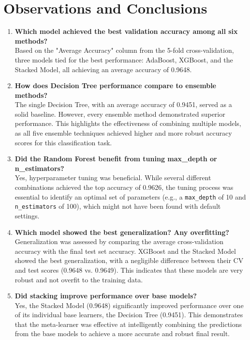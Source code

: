 \documentclass[12pt]{article}
\begin{document}
\section{Observations and Conclusions}

\begin{enumerate}[label=\textbf{\arabic*.}]
    \item \textbf{Which model achieved the best validation accuracy among all six methods?} \\
    Based on the "Average Accuracy" column from the 5-fold cross-validation, three models tied for the best performance: AdaBoost, XGBoost, and the Stacked Model, all achieving an average accuracy of 0.9648.

    \item \textbf{How does Decision Tree performance compare to ensemble methods?} \\
    The single Decision Tree, with an average accuracy of 0.9451, served as a solid baseline. However, every ensemble method demonstrated superior performance. This highlights the effectiveness of combining multiple models, as all five ensemble techniques achieved higher and more robust accuracy scores for this classification task.

    \item \textbf{Did the Random Forest benefit from tuning max\_depth or n\_estimators?} \\
     Yes, hyperparameter tuning was beneficial. While several different combinations achieved the top accuracy of 0.9626, the tuning process was essential to identify an optimal set of parameters (e.g., a \texttt{max\_depth} of 10 and \texttt{n\_estimators} of 100), which might not have been found with default settings.

    \item \textbf{Which model showed the best generalization? Any overfitting?} \\
    Generalization was assessed by comparing the average cross-validation accuracy with the final test set accuracy. XGBoost and the Stacked Model showed the best generalization, with a negligible difference between their CV and test scores (0.9648 vs. 0.9649). This indicates that these models are very robust and not overfit to the training data.

    \item \textbf{Did stacking improve performance over base models?} \\
    Yes, the Stacked Model (0.9648) significantly improved performance over one of its individual base learners, the Decision Tree (0.9451). This demonstrates that the meta-learner was effective at intelligently combining the predictions from the base models to achieve a more accurate and robust final result.
\end{enumerate}
\end{document}
